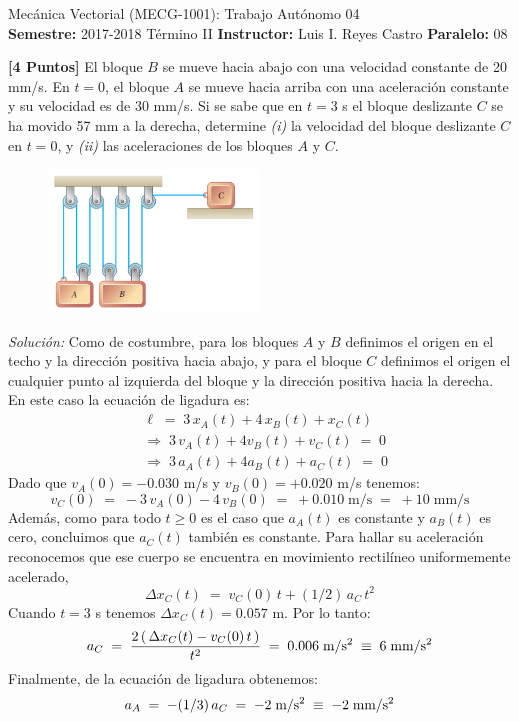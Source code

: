 \documentclass[ a4paper, twoside, 11pt]{article}
\newcommand{\numero}{04}
\begin{document}
\allowdisplaybreaks

\begin{center}
\Large Mec\'anica Vectorial (MECG-1001): Trabajo Aut\'onomo \numero \\[2ex]
\small \textbf{Semestre:} 2017-2018 T\'ermino II \qquad
\textbf{Instructor:} Luis I. Reyes Castro \qquad
\textbf{Paralelo:} 08
\end{center}
\fullskip

\begin{problem}
\textbf{[4 Puntos]} El bloque $B$ se mueve hacia abajo con una velocidad constante de 20 mm/s. En $t=0$, el bloque $A$ se mueve hacia arriba con una aceleraci\'on constante y su velocidad es de 30 mm/s. Si se sabe que en $t=3$ s el bloque deslizante $C$ se ha movido 57 mm a la derecha, determine \textit{(i)} la velocidad del bloque deslizante $C$ en $t=0$, y \textit{(ii)} las aceleraciones de los bloques $A$ y $C$. 

\begin{figure}[htb]
\centering
\includegraphics[width=0.5\textwidth]{problema-1.jpg}
\end{figure}

\emph{Soluci\'on:} Como de costumbre, para los bloques $A$ y $B$ definimos el origen en el techo y la direcci\'on positiva hacia abajo, y para el bloque $C$ definimos el origen el cualquier punto al izquierda del bloque y la direcci\'on positiva hacia la derecha. En este caso la ecuaci\'on de ligadura es: 
\begin{align*}
& \ell \; = \; 3 \, x_A(t) + 4 \, x_B(t) + x_C(t) \\
& \Longrightarrow \; 3 \, v_A(t) + 4 v_B(t) + v_C(t) \; = \; 0 \\
& \Longrightarrow \; 3 \, a_A(t) + 4 a_B(t) + a_C(t) \; = \; 0
\end{align*}
Dado que $v_A(0) = -0.030$ m/s y $v_B(0) = +0.020$ m/s tenemos: 
\[
v_C(0) \; = \; -3 \, v_A(0) - 4 \, v_B(0)
\; = \; +0.010 \; \text{m/s} \; = \; +10 \; \text{mm/s}
\]
Adem\'as, como para todo $t \geq 0$ es el caso que $a_A(t)$ es constante y $a_B(t)$ es cero, concluimos que $a_C(t)$ tambi\'en es constante. Para hallar su aceleraci\'on reconocemos que ese cuerpo se encuentra en movimiento rectil\'ineo uniformemente acelerado, \iec
\[
\Delta x_C(t) \; = \; v_C(0) \, t + (1/2) \, a_C \, t^2 
\]
Cuando $t = 3$ s tenemos $\Delta x_C(t) = 0.057$ m. Por lo tanto: 
\[
a_C \; = \;
\frac{2 \, ( \, \Delta x_C(t) - v_C(0) \, t \, )}{t^2} \; = \;
0.006 \; \text{m/s\ensuremath{^{\text{2}}}} \; \equiv \; 6 \; \text{mm/s\ensuremath{^{\text{2}}}}
\]
Finalmente, de la ecuaci\'on de ligadura obtenemos: 
\[
a_A \; = \; -(1/3) \, a_C \; = \; -2 \; \text{m/s\ensuremath{^{\text{2}}}} \; \equiv \; -2 \; \text{mm/s\ensuremath{^{\text{2}}}}
\]

\end{problem}
\end{document}
